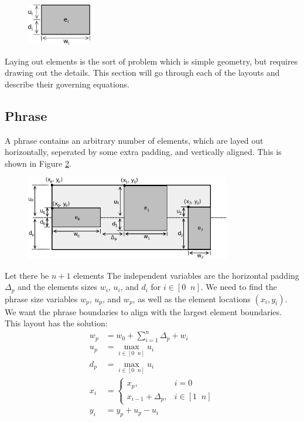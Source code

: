 \documentclass[12pt]{article}
\begin{document}
\begin{figure}[ht]
	\centering
		\includegraphics[width=0.25\textwidth]{Fig/LayoutElementDimensions.pdf}
	\caption{}
	\label{fig:layout_element_dimensions}
\end{figure}

Laying out elements is the sort of problem which is simple geometry, but requires drawing out the details. This section will go through each of the layouts and describe their governing equations.

\subsection{Phrase}

A phrase contains an arbitrary number of elements, which are layed out horizontally, seperated by some extra padding, and vertically aligned. This is shown in Figure \ref{fig:layout_phrase}.

\begin{figure}[ht]
	\centering
		\includegraphics[width=0.8\textwidth]{Fig/LayoutPhrase.pdf}
	\caption{}
	\label{fig:layout_phrase}
\end{figure}

Let there be $n+1$ elements The independent variables are the horizontal padding $\Delta_p$ and the elements sizes $w_i$, $u_i$, and $d_i$ for $i \in [0 \;\; n]$. We need to find the phrase size variables $w_p$, $u_p$, and $w_p$, as well as the element locations $(x_i, y_i)$. We want the phrase boundaries to align with the largest element boundaries. This layout has the solution:
\begin{align*}
w_p &= w_0 + \sum_{i=1}^n \Delta_p + w_i \\
u_p &= \max_{i \in [0 \;\; n]} u_i \\
d_p &= \max_{i \in [0 \;\; n]} u_i \\
x_i &=
\begin{cases}
x_p, & i=0\\
x_{i-1} + \Delta_p, & i \in [1 \;\; n]
\end{cases} \\
y_i &= y_p + u_p - u_i
\end{align*}
\end{document}
